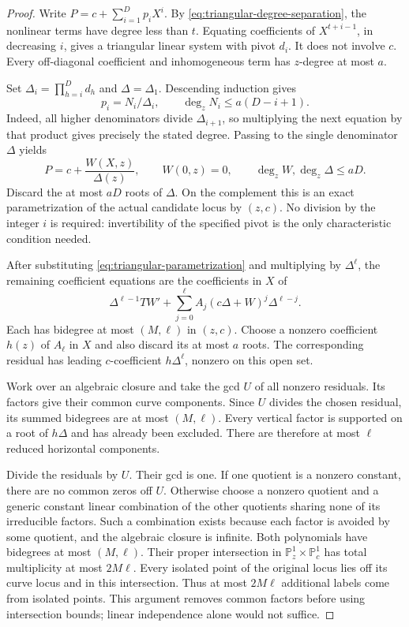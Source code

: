 \begin{proof}
Write $P=c+\sum_{i=1}^D p_iX^i$. By
\eqref{eq:triangular-degree-separation}, the nonlinear terms have degree
less than $t$. Equating coefficients of $X^{t+i-1}$, in decreasing $i$,
gives a triangular linear system with pivot $d_i$. It does not involve
$c$. Every off-diagonal coefficient and inhomogeneous term has
$z$-degree at most $a$.

Set $\Delta_i=\prod_{h=i}^D d_h$ and $\Delta=\Delta_1$.
Descending induction gives
\[
 p_i=N_i/\Delta_i,\qquad \deg_zN_i\le a(D-i+1).
\]
Indeed, all higher denominators divide $\Delta_{i+1}$, so multiplying
the next equation by that product gives precisely the stated degree.
Passing to the single denominator $\Delta$ yields
\begin{equation}\label{eq:triangular-parametrization}
 P=c+\frac{W(X,z)}{\Delta(z)},\qquad W(0,z)=0,
 \qquad \deg_zW,\deg_z\Delta\le aD.
\end{equation}
Discard the at most $aD$ roots of $\Delta$. On the complement this is
an exact parametrization of the actual candidate locus by $(z,c)$.
No division by the integer $i$ is required: invertibility of the specified
pivot is the only characteristic condition needed.

After substituting \eqref{eq:triangular-parametrization} and multiplying
by $\Delta^\ell$, the remaining coefficient equations are the
coefficients in $X$ of
\[
 \Delta^{\ell-1}T W'
 +\sum_{j=0}^{\ell}A_j(c\Delta+W)^j\Delta^{\ell-j}.
\]
Each has bidegree at most $(M,\ell)$ in $(z,c)$.
Choose a nonzero coefficient $h(z)$ of $A_\ell$ in $X$ and also discard
its at most $a$ roots. The corresponding residual has leading
$c$-coefficient $h\Delta^\ell$, nonzero on this open set.

Work over an algebraic closure and take the gcd $U$ of all nonzero
residuals. Its factors give their common curve components. Since $U$
divides the chosen residual, its summed bidegrees are at most $(M,\ell)$.
Every vertical factor is supported on a root of $h\Delta$ and has already
been excluded. There are therefore at most $\ell$ reduced horizontal
components.

Divide the residuals by $U$. Their gcd is one. If one quotient is a
nonzero constant, there are no common zeros off $U$. Otherwise choose a
nonzero quotient and a generic constant linear combination of the other
quotients sharing none of its irreducible factors. Such a combination
exists because each factor is avoided by some quotient, and the
algebraic closure is infinite. Both polynomials have bidegrees at most
$(M,\ell)$. Their proper intersection in
$\mathbb P^1_z\times\mathbb P^1_c$ has total multiplicity at most
$2M\ell$. Every isolated point of the original locus lies off its curve
locus and in this intersection. Thus at most $2M\ell$ additional labels
come from isolated points. This argument removes common factors before
using intersection bounds; linear independence alone would not suffice.


\end{proof}
